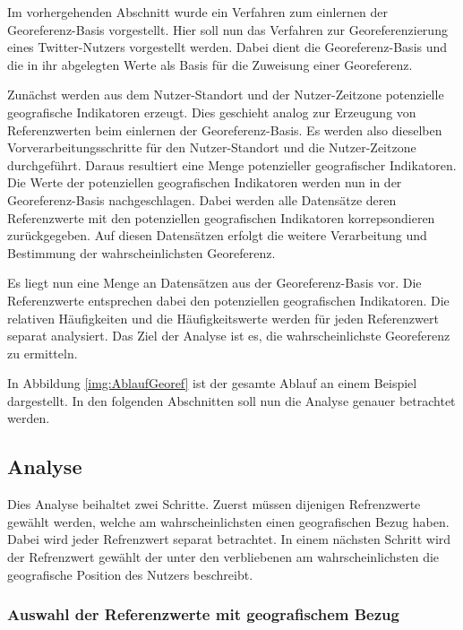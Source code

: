 		Im vorhergehenden Abschnitt wurde ein Verfahren zum einlernen der Georeferenz-Basis vorgestellt. 
		Hier soll nun das Verfahren zur Georeferenzierung eines Twitter-Nutzers vorgestellt werden.
		Dabei dient die Georeferenz-Basis und die in ihr abgelegten Werte als Basis für die Zuweisung einer Georeferenz.

		Zunächst werden aus dem Nutzer-Standort und der Nutzer-Zeitzone potenzielle geografische Indikatoren erzeugt.
		Dies geschieht analog zur Erzeugung von Referenzwerten beim einlernen der Georeferenz-Basis.
		Es werden also dieselben Vorverarbeitungsschritte für den Nutzer-Standort und die Nutzer-Zeitzone durchgeführt.
		Daraus resultiert eine Menge potenzieller geografischer Indikatoren.
		Die Werte der potenziellen geografischen Indikatoren werden nun in der Georeferenz-Basis nachgeschlagen. 
		Dabei werden alle Datensätze deren Referenzwerte mit den potenziellen geografischen Indikatoren korrepsondieren zurückgegeben.
		Auf diesen Datensätzen erfolgt die weitere Verarbeitung und Bestimmung der wahrscheinlichsten Georeferenz.
		
		Es liegt nun eine Menge an Datensätzen aus der Georeferenz-Basis vor.
		Die Referenzwerte entsprechen dabei den potenziellen geografischen Indikatoren.
		Die relativen Häufigkeiten und die Häufigkeitswerte werden für jeden Referenzwert separat analysiert.
		Das Ziel der Analyse ist es, die wahrscheinlichste Georeferenz zu ermitteln.

		In Abbildung \ref{img:AblaufGeoref} ist der gesamte Ablauf an einem Beispiel dargestellt.
		In den folgenden Abschnitten soll nun die Analyse genauer betrachtet werden.

		\subsection{Analyse}

			Dies Analyse beihaltet zwei Schritte. 
			Zuerst müssen dijenigen Refrenzwerte gewählt werden, welche am wahrscheinlichsten einen geografischen Bezug haben.
			Dabei wird jeder Refrenzwert separat betrachtet. 
			In einem nächsten Schritt wird der Refrenzwert gewählt der unter den verbliebenen am wahrscheinlichsten die geografische Position des Nutzers beschreibt. 

			\subsubsection{Auswahl der Referenzwerte mit geografischem Bezug}

